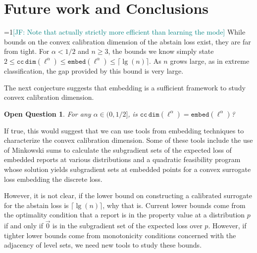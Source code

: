 \documentclass[anon,12pt]{colt2021} %
\newcommand{\Comments}{1}
\newcommand{\mynote}[2]{\ifnum\Comments=1\textcolor{#1}{#2}\fi}
\newcommand{\jessie}[1]{\mynote{teal}{[JF: #1]}}
\newcommand{\ccdim}{\mathtt{cc\,dim}}
\newcommand{\embed}{\mathtt{embed}}
\newtheorem{openq}{Open Question}
\begin{document}
\section{Future work and Conclusions}
\jessie{Note that actually strictly more efficient than learning the mode}
While bounds on the convex calibration dimension of the abstain loss exist, they are far from tight.
For $\alpha < 1/2$ and $n \geq 3$, the bounds we know simply state $2 \leq \ccdim(\ell^\alpha) \leq \embed(\ell^\alpha) \leq \lceil \lg(n) \rceil$.
As $n$ grows large, as in extreme classification, the gap provided by this bound is very large.

The next conjecture suggests that embedding is a sufficient framework to study convex calibration dimension.
\begin{openq}
	For any $\alpha \in (0,1/2]$, is $\ccdim(\ell^\alpha) = \embed(\ell^\alpha)$?
\end{openq}

If true, this would suggest that we can use tools from embedding techniques to characterize the convex calibration dimension.
Some of these tools include the use of Minkowski sums to calculate the subgradient sets of the expected loss of embedded reports at various distributions and a quadratic feasibility program whose solution yields subgradient sets at embedded points for a convex surrogate loss embedding the discrete loss.

However, it is not clear, if the lower bound on constructing a calibrated surrogate for the abstain loss is $\lceil \lg(n) \rceil$, why that is.
Current lower bounds come from the optimality condition that a report is in the property value at a distribution $p$ if and only if $\vec 0$ is in the subgradient set of the expected loss over $p$.
However, if tighter lower bounds come from monotonicity conditions concerned with the adjacency of level sets, we need new tools to study these bounds.


\newpage


\end{document}
